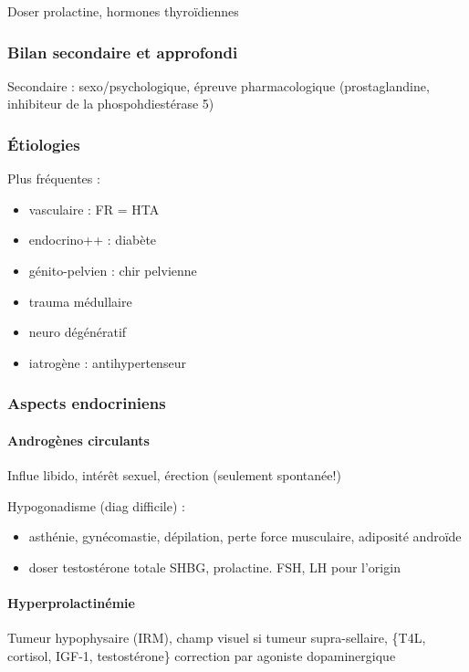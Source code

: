 \documentclass[11pt]{article}
\begin{document}
Doser prolactine, hormones thyroïdiennes

\subsubsection{Bilan secondaire et approfondi}
\label{sec:org7c639bd}
Secondaire : sexo/psychologique, épreuve pharmacologique (prostaglandine,
inhibiteur de la phospohdiestérase 5)

\subsubsection{Étiologies}
\label{sec:orgc0d2dbb}
Plus fréquentes :
\begin{itemize}
\item vasculaire : FR = HTA
\item endocrino++ : diabète
\item génito-pelvien : chir pelvienne
\item trauma médullaire
\item neuro dégénératif
\item iatrogène : antihypertenseur
\end{itemize}

\subsubsection{Aspects endocriniens}
\label{sec:orge83cbd3}
\paragraph{Androgènes circulants}
\label{sec:org8cc68bf}
Influe libido, intérêt sexuel, érection (seulement spontanée!)

Hypogonadisme (diag difficile) : 
\begin{itemize}
\item asthénie, gynécomastie, dépilation, perte force musculaire, adiposité androïde
\item doser testostérone totale \textpm{} SHBG, prolactine. FSH, LH pour l'origin
\end{itemize}

\paragraph{Hyperprolactinémie}
\label{sec:org201966d}
Tumeur hypophysaire (IRM), champ visuel si tumeur
supra-sellaire, \{T4L, cortisol, IGF-1, testostérone\}
\thus correction par agoniste dopaminergique
\end{document}
